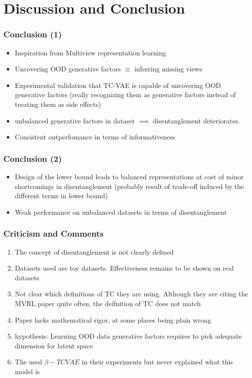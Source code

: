 \documentclass{beamer}
\theoremstyle{definition}
\begin{document}
    \section{Discussion and Conclusion}

    \begin{frame}
      \frametitle{Conclusion (1)}
      \begin{itemize}
        \item Inspiration from Multiview representation learning
        \item Uncovering OOD generative factors $\equiv$ inferring missing views
        \item Experimental validation that TC-VAE is capable of uncovering OOD generative factors (really recognizing them as generative factors instead of treating them as side effects)
        \item unbalanced generative factors in dataset $\implies$ disentanglement deteriorates.
        \item Consistent outperfomance in terms of informativeness
      \end{itemize}
    \end{frame}

    \begin{frame}
      \frametitle{Conclusion (2)}
      \begin{itemize}
        \item Design of the lower bound leads to balanced representations at cost of minor shortcomings in disentanglement (probably result of trade-off induced by the different terms in lower bound)
        \item Weak performance on unbalanced datasets in terms of disentanglement
      \end{itemize}
    \end{frame}

    \begin{frame}
      \frametitle{Criticism and Comments}
      \begin{enumerate}
        \item The concept of disentanglement is not clearly defined
        \item Datasets used are toy datasets. Effectiveness remains to be shown on real datasets
        \item Not clear which definitions of TC they are using. Although they are citing the MVRL paper quite often, the deifnition of TC does not match
        \item Paper lacks mathematical rigor, at some places being plain wrong
        \item hypothesis: Learning OOD data generative factors requires to pick adequate dimension for latent space
        \item The used $\beta-TCVAE$ in their experiments but never explained what this model is
      \end{enumerate}
    \end{frame}
\end{document}
